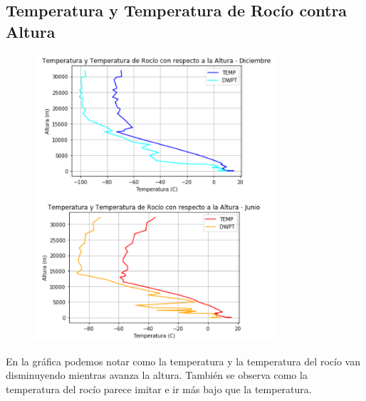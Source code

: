 \documentclass[a4paper]{article}
\begin{document}
\subsection{Temperatura y Temperatura de Rocío contra Altura}
\bigskip
 \begin{figure}[h!]
 \centering
  \includegraphics[width=0.8\textwidth]{Grafica3.PNG}
 \end{figure}
\bigskip

En la gráfica podemos notar como la temperatura y la temperatura del rocío van disminuyendo mientras avanza la altura. También se observa como la temperatura del rocío parece imitar e ir más bajo que la temperatura.

\pagebreak
\end{document}
